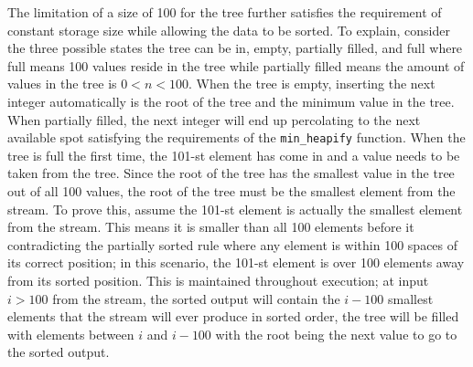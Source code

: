 \documentclass{article}
\begin{document}
The limitation of a size of 100 for the tree further satisfies the requirement 
of constant storage size while allowing the data to be sorted. To explain,
consider the three possible states the tree can be in, empty, partially filled,
and full where full means 100 values reside in the tree while partially filled
means the amount of values in the tree is $0 < n < 100$. When the tree is empty,
inserting the next integer automatically is the root of the tree and the minimum
value in the tree. When partially filled, the next integer will end up
percolating to the next available spot satisfying the requirements of the 
\texttt{min\_heapify} function. When the tree is full the first time, the 101-st element
has come in and a value needs to be taken from the tree. Since the root of the 
tree has the smallest value in the tree out of all 100 values, the root of the 
tree must be the smallest element from the stream. To prove this, assume the 
101-st element is actually the smallest element from the stream. This means it 
is smaller than all 100 elements before it contradicting the partially sorted
rule where any element is within 100 spaces of its correct position; in this
scenario, the 101-st element is over 100 elements away from its sorted position.
This is maintained throughout execution; at input $i > 100$ from the stream,
the sorted output will contain the $i - 100$ smallest elements that the stream
will ever produce in sorted order, the tree will be filled with elements between
$i$ and $i - 100$ with the root being the next value to go to the sorted output.


\newpage
\end{document}
